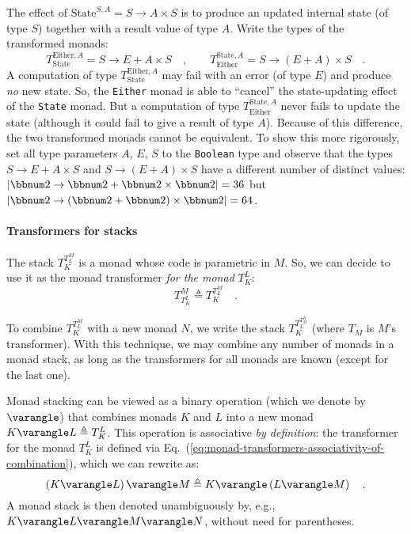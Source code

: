 The effect of $\text{State}^{S,A}=S\rightarrow A\times S$ is to produce
an updated internal state (of type $S$) together with a result value
of type $A$. Write the types of the transformed monads:
\[
T_{\text{State}}^{\text{Either},A}=S\rightarrow E+A\times S\quad,\quad\quad T_{\text{Either}}^{\text{State},A}=S\rightarrow\left(E+A\right)\times S\quad.
\]
A computation of type $T_{\text{State}}^{\text{Either},A}$ may fail
with an error (of type $E$) and produce \emph{no} new state. So,
the \lstinline!Either! monad is able to \textsf{``}cancel\textsf{''} the state-updating
effect of the \lstinline!State! monad. But a computation of type
$T_{\text{Either}}^{\text{State},A}$ never fails to update the state
(although it could fail to give a result of type $A$). Because of
this difference, the two transformed monads cannot be equivalent.
To show this more rigorously, set all type parameters $A$, $E$,
$S$ to the \lstinline!Boolean! type and observe that the types $S\rightarrow E+A\times S$
and $S\rightarrow\left(E+A\right)\times S$ have a different number
of distinct values: $\left|\bbnum 2\rightarrow\bbnum 2+\bbnum 2\times\bbnum 2\right|=36$
but $\left|\bbnum 2\rightarrow\left(\bbnum 2+\bbnum 2\right)\times\bbnum 2\right|=64$.

\paragraph{Transformers for stacks}

The stack $T_{K}^{T_{L}^{M}}$ is a monad whose code is parametric
in $M$. So, we can decide to use it as the monad transformer \emph{for
the monad} $T_{K}^{L}$:
\begin{equation}
T_{T_{K}^{L}}^{M}\triangleq T_{K}^{T_{L}^{M}}\quad.\label{eq:monad-transformers-associativity-of-combination}
\end{equation}
\vspace{-1.2\baselineskip}

To combine $T_{K}^{T_{L}^{M}}$ with a new monad $N$, we write the
stack $T_{K}^{T_{L}^{T_{M}^{N}}}$ (where $T_{M}$ is $M$\textsf{'}s transformer).
With this technique, we may combine any number of monads in a monad
stack, as long as the transformers for all monads are known (except
for the last one).

Monad stacking can be viewed as a binary operation (which we denote
by $\varangle$) that combines monads $K$ and $L$ into a new monad
$K\varangle L\triangleq T_{K}^{L}$. This operation is associative
\emph{by definition}: the transformer for the monad $T_{K}^{L}$ is
defined via Eq.~(\ref{eq:monad-transformers-associativity-of-combination}),
which we can rewrite as:
\[
\left(K\varangle L\right)\varangle M\triangleq K\varangle\left(L\varangle M\right)\quad.
\]
 A monad stack is then denoted unambiguously by, e.g., $K\varangle L\varangle M\varangle N$,
without need for parentheses.

